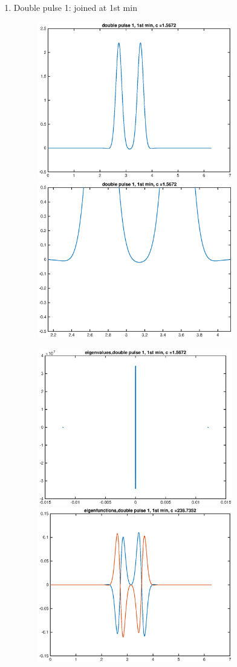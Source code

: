 \documentclass[12pt]{article}
\begin{document}
\begin{enumerate}
	\item Double pulse 1: joined at 1st min
	\begin{figure}[H]
	\includegraphics[width=8.5cm]{KdVdouble1.eps}
	\includegraphics[width=8.5cm]{KdVdouble1zoom.eps}
	\end{figure}
	\begin{figure}[H]
	\includegraphics[width=8.5cm]{KdVdouble1eig.eps}
	\includegraphics[width=8.5cm]{KdVdouble1eigfn.eps}
	\end{figure}


\end{enumerate}
\end{document}
